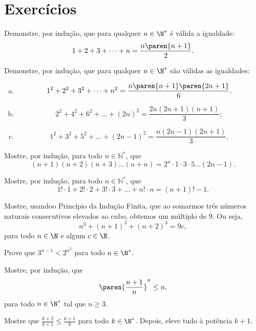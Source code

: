\section{Exercícios}

\begin{exercise}
Demonstre, por indução, que para qualquer $n \in \N^*$ é válida a igualdade:
$$1+2+ 3+ \dots + n = \frac{n \paren {n+1}} 2.$$
\end{exercise}

\begin{exercise}
Demonstre, por indução, que para qualquer $n \in \N^*$ são válidas as igualdades:
\begin{enumerate}[a)]
	\item $$1^2 +2^2 + 3^2+ \dots + n^2 = \frac{n \paren {n+1} \paren{2n+1}} 6.$$
	\item $$2^2 + 4^2 + 6^2 + \dots + (2n)^2 = \dfrac{2n(2n+1)(n+1)}{3};$$
	\item $$1^2 + 3^2 + 5^2 + \dots + (2n-1)^2 = \frac{n(2n-1)(2n+1)}{3}.$$
\end{enumerate}
\end{exercise}

\begin{exercise}
	Mostre, por indução, para todo $n \in \mathbb N^\ast $, que 
	$$(n+1)(n+2)(n+3) \dots (n+n) = 2^n \cdot 1 \cdot 3 \cdot 5 \dots (2n-1) .$$
\end{exercise}

\begin{exercise}
	Mostre, por indução, para todo $n \in \mathbb N^\ast $, que
	$$1!\cdot 1 + 2! \cdot 2 + 3! \cdot 3 + \dots + n! \cdot n = (n+1)! - 1.$$
\end{exercise}

\begin{exercise}
	Mostre, usandoo Princípio da Indução Finita, que ao somarmos três números naturais consecutivos elevados ao cubo, obtemos um múltiplo de 9. Ou seja,
	$$n^3 + (n+1)^3 + (n+2)^3 = 9c,$$
para todo $n \in \N $ e algum $c \in \N$.
\end{exercise}

\begin{exercise}
Prove que $3^{n-1} < 2^{n^2}$ para todo $n \in \N^*$.
\end{exercise}

\begin{exercise}
Mostre, por indução, que
$$\paren{\frac {n+1}{n}}^n \leq n,$$
para todo $n \in \N^*$ tal que $n \geq 3$.

\begin{hint}
Mostre que $\frac{k+2}{k+1} \leq \frac{k+1} k$ para todo $k \in
\N^*$. Depois, eleve tudo à potência $k+1$.
\end{hint}
\end{exercise}

